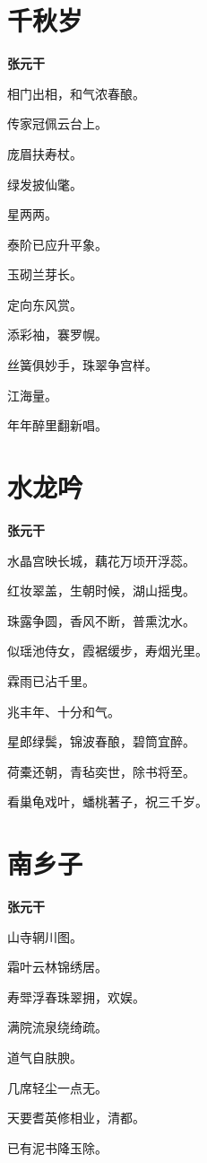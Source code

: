 \documentclass[12pt,a4paper]{ctexbook}
\begin{document}
\section{千秋岁}
\textbf{张元干}\par\vspace{0.5em}
相门出相，和气浓春酿。\par
传家冠佩云台上。\par
庞眉扶寿杖。\par
绿发披仙氅。\par
星两两。\par
泰阶已应升平象。\par
玉砌兰芽长。\par
定向东风赏。\par
添彩袖，褰罗幌。\par
丝簧俱妙手，珠翠争宫样。\par
江海量。\par
年年醉里翻新唱。\par

\section{水龙吟}
\textbf{张元干}\par\vspace{0.5em}
水晶宫映长城，藕花万顷开浮蕊。\par
红妆翠盖，生朝时候，湖山摇曳。\par
珠露争圆，香风不断，普熏沈水。\par
似瑶池侍女，霞裾缓步，寿烟光里。\par
霖雨已沾千里。\par
兆丰年、十分和气。\par
星郎绿鬓，锦波春酿，碧筒宜醉。\par
荷橐还朝，青毡奕世，除书将至。\par
看巢龟戏叶，蟠桃著子，祝三千岁。\par

\section{南乡子}
\textbf{张元干}\par\vspace{0.5em}
山寺辋川图。\par
霜叶云林锦绣居。\par
寿斝浮春珠翠拥，欢娱。\par
满院流泉绕绮疏。\par
道气自肤腴。\par
几席轻尘一点无。\par
天要耆英修相业，清都。\par
已有泥书降玉除。\par
\end{document}
